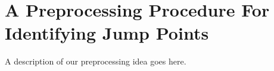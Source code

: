 \section{A Preprocessing Procedure For Identifying Jump Points}
A description of our preprocessing idea goes here.
